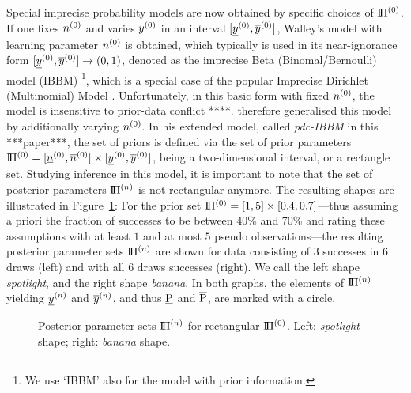 Special imprecise probability models are now obtained by specific
choices of $\PZ$. If one fixes $n^{(0)}$ and varies $y^{(0)}$ in an interval $[\underline{y}^{(0)},\overline{y}^{(0)}]$,
Walley's \parencite*[\S 5.3]{1991:walley} model with learning parameter $n^{(0)}$ is obtained, which typically
is used in its near-ignorance form $[\underline{y}^{(0)}, \overline{y}^{(0)}] \to (0,1)$,
denoted as the imprecise Beta (Binomal/Bernoulli) model (IBBM)%
\footnote{We use `IBBM' also for the model with prior information.},
which is a special case of the popular Imprecise Dirichlet (Multinomial) Model
\parencite{1996:walley::idm,1999:walleybernard}. Unfortunately, in this basic form with fixed $n^{(0)}$, the model is
insensitive to prior-data conflict \parencite[p.~263]{Walter2009a} ****.
\textcite[\S 5.4]{1991:walley} therefore generalised this
model by additionally varying $n^{(0)}$. In his extended model,
called \emph{pdc-IBBM} in this ***paper***, the set of priors is defined via the
set of prior parameters $\text{I}\!\Pi^{(0)} = [\underline{n}^{(0)}, \overline{n}^{(0)}] \times [\underline{y}^{(0)}, \overline{y}^{(0)}]$,
being a two-dimensional interval, or a rectangle set.
Studying inference in this model, it is important to note that the set of posterior parameters
$\PN$ is not rectangular anymore. The resulting shapes are illustrated in Figure~\ref{fig:spot-banana}: For the
prior set $\text{I}\!\Pi^{(0)} = [1, 5 ] \times  [0.4, 0.7]$---thus assuming a priori the
fraction of successes to be between 40\% and 70\% and rating these assumptions
with at least $1$ and at most $5$ pseudo observations---the resulting posterior parameter sets $\PN$
are shown for data consisting of 3 successes in 6 draws (left) and with all 6 draws successes (right). %
We call the left shape \emph{spotlight}, and the right shape
\emph{banana}. In both graphs, the elements of $\PN$ yielding
$\underline{y}^{(n)}$ and $\overline{y}^{(n)}$, and thus $\underline{\operatorname{P}}$ and $\overline{\operatorname{P}}$,
are marked with a circle.

\begin{figure}%
\caption[Posterior parameter sets $\PN$ for rectangular $\PZ$.]%
{Posterior parameter sets $\PN$ for rectangular $\PZ$. Left: \emph{spotlight} shape; right: \emph{banana} shape.}
\label{fig:spot-banana}
\end{figure}

